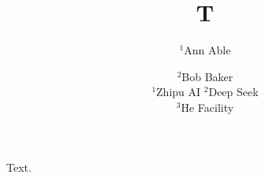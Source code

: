 \documentclass{article}
\begin{document}
\title{T}
\author{$^1$Ann Able \and $^2$Bob Baker\\
$^1$Zhipu AI \quad $^2$Deep Seek\\
$^{3}$He Facility}
\maketitle
Text.
\end{document}
